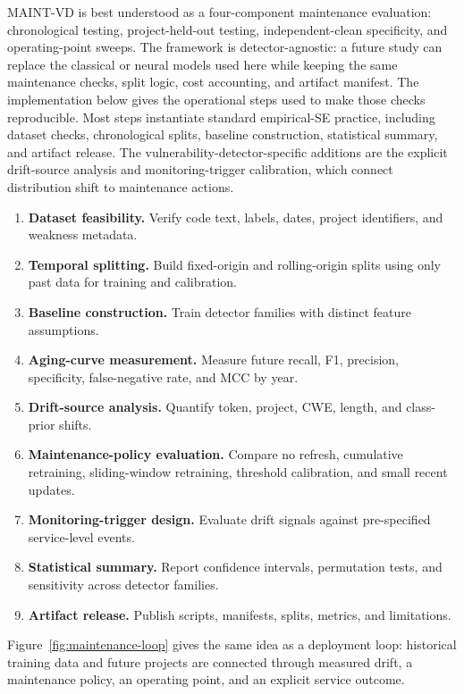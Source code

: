 \documentclass[a4paper,fleqn]{cas-dc}
\begin{document}
MAINT-VD is best understood as a four-component maintenance evaluation:
chronological testing, project-held-out testing, independent-clean specificity,
and operating-point sweeps. The framework is detector-agnostic: a future study
can replace the classical or neural models used here while keeping the same
maintenance checks, split logic, cost accounting, and artifact manifest. The
implementation below gives the operational steps used to make those checks
reproducible. Most steps instantiate standard empirical-SE practice, including
dataset checks, chronological splits, baseline construction, statistical
summary, and artifact release. The vulnerability-detector-specific additions
are the explicit drift-source analysis and monitoring-trigger calibration,
which connect distribution shift to maintenance actions.

\begin{enumerate}
  \item \textbf{Dataset feasibility.} Verify code text, labels, dates, project
  identifiers, and weakness metadata.
  \item \textbf{Temporal splitting.} Build fixed-origin and rolling-origin
  splits using only past data for training and calibration.
  \item \textbf{Baseline construction.} Train detector families with distinct
  feature assumptions.
  \item \textbf{Aging-curve measurement.} Measure future recall, F1, precision,
  specificity, false-negative rate, and MCC by year.
  \item \textbf{Drift-source analysis.} Quantify token, project, CWE, length,
  and class-prior shifts.
  \item \textbf{Maintenance-policy evaluation.} Compare no refresh, cumulative
  retraining, sliding-window retraining, threshold calibration, and small recent
  updates.
  \item \textbf{Monitoring-trigger design.} Evaluate drift signals against
  pre-specified service-level events.
  \item \textbf{Statistical summary.} Report confidence intervals, permutation
  tests, and sensitivity across detector families.
  \item \textbf{Artifact release.} Publish scripts, manifests, splits, metrics,
  and limitations.
\end{enumerate}

Figure~\ref{fig:maintenance-loop} gives the same idea as a deployment loop:
historical training data and future projects are connected through measured
drift, a maintenance policy, an operating point, and an explicit service
outcome.
\end{document}
